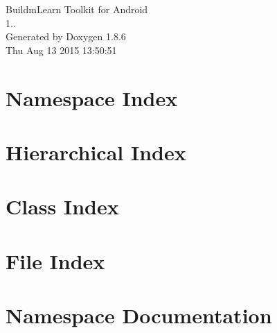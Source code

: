 \documentclass[twoside]{book}
\newcommand{\clearemptydoublepage}{%
  \newpage{\pagestyle{empty}\cleardoublepage}%
}
\begin{document}
\hypersetup{pageanchor=false}
\begin{titlepage}
\vspace*{7cm}
\begin{center}%
{\Large Buildm\-Learn Toolkit for Android \\[1ex]\large 1.. }\\
\vspace*{1cm}
{\large Generated by Doxygen 1.8.6}\\
\vspace*{0.5cm}
{\small Thu Aug 13 2015 13:50:51}\\
\end{center}
\end{titlepage}
\clearemptydoublepage
\tableofcontents
\clearemptydoublepage
{}
\hypersetup{pageanchor=true}

\chapter{Namespace Index}

\chapter{Hierarchical Index}

\chapter{Class Index}

\chapter{File Index}

\chapter{Namespace Documentation}
















\end{document}
